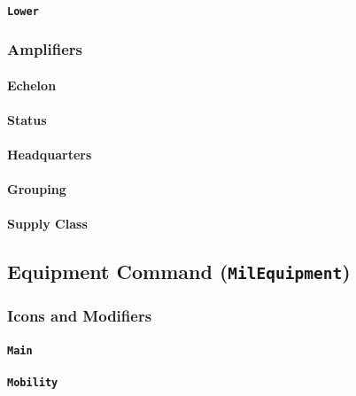 \documentclass[a4paper, titlepage]{article}
\begin{document}
\paragraph{\texttt{Lower}}
%

\subsubsection{Amplifiers}

\paragraph{Echelon}

\paragraph{Status}

\paragraph{Headquarters}

\paragraph{Grouping}

\paragraph{Supply Class}


\subsection{Equipment Command (\textbf{\texttt{MilEquipment}})}

\subsubsection{Icons and Modifiers}

\paragraph{\texttt{Main}}
%

\paragraph{\texttt{Mobility}}
%
\end{document}
